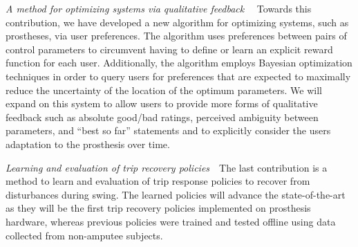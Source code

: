 \begin{contributions}
    \item\label{contrib:pref_opt} \emph{A method for optimizing systems via
    qualitative feedback}~~ Towards this contribution, we have developed a new
    algorithm for optimizing systems, such as prostheses, via user preferences.
    The algorithm uses preferences between pairs of control parameters to
    circumvent having to define or learn an explicit reward function for each
    user. Additionally, the algorithm employs Bayesian optimization techniques
    in order to query users for preferences that are expected to maximally
    reduce the uncertainty of the location of the optimum parameters. We will
    expand on this system to allow users to provide more forms of qualitative
    feedback such as absolute good/bad ratings, perceived ambiguity between
    parameters, and ``best so far'' statements and to explicitly consider the
    users adaptation to the prosthesis over time.


    \item\label{contrib:trip_recovery} \emph{Learning and evaluation of trip
    recovery policies}~~The last contribution is a method to learn and
    evaluation of trip response policies to recover from disturbances during
    swing. The learned policies will advance the state-of-the-art as they will
    be the first trip recovery policies implemented on prosthesis hardware,
    whereas previous policies were trained and tested offline using data
    collected from non-amputee subjects.
\end{contributions}
